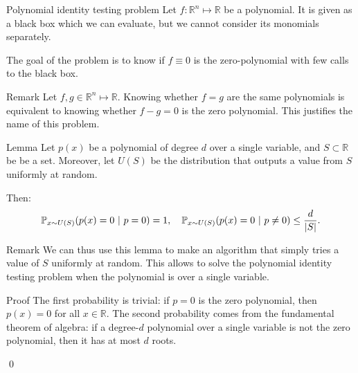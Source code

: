 \documentclass[a4paper]{article}
\begin{document}
\begin{parag}{Polynomial identity testing problem}
    Let $f: \mathbb{R}^n \mapsto \mathbb{R}$ be a polynomial. It is given as a black box which we can evaluate, but we cannot consider its monomials separately.

    The goal of the  problem is to know if $f \equiv 0$ is the zero-polynomial with few calls to the black box.

    \begin{subparag}{Remark}
        Let $f, g \in \mathbb{R}^n \mapsto \mathbb{R}$. Knowing whether $f = g$ are the same polynomials is equivalent to knowing whether $f - g = 0$ is the zero polynomial. This justifies the name of this problem.
    \end{subparag}
\end{parag}

\begin{parag}{Lemma}
    Let $p\left(x\right)$ be a polynomial of degree $d$ over a single variable, and $S \subset \mathbb{R}$ be be a set. Moreover, let $U\left(S\right)$ be the distribution that outputs a value from $S$ uniformly at random.

    Then: 
    \[\prob_{x \followsdistr U\left(S\right)}\left(p\left(x\right) = 0 \suchthat p = 0\right) = 1, \mathspace \prob_{x \followsdistr U\left(S\right)}\left(p\left(x\right) = 0 \suchthat p \neq 0\right) \leq \frac{d}{\left|S\right|}.\]

    \begin{subparag}{Remark}
        We can thus use this lemma to make an algorithm that simply tries a value of $S$ uniformly at random. This allows to solve the polynomial identity testing problem when the polynomial is over a single variable.
    \end{subparag}
    
    \begin{subparag}{Proof}
        The first probability is trivial: if $p =0$ is the zero polynomial, then $p\left(x\right)=  0$ for all $x \in \mathbb{R}$. The second probability comes from the fundamental theorem of algebra: if a degree-$d$ polynomial over a single variable is not the zero polynomial, then it has at most $d$ roots. 

        \qed
    \end{subparag}
\end{parag}
\end{document}
